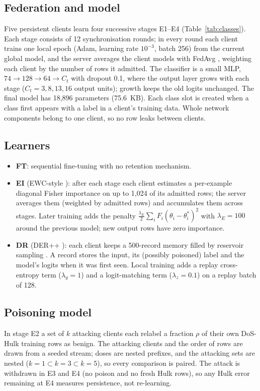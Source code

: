 \documentclass[10pt,a4paper]{article}
\begin{document}
\subsection{Federation and model}
Five persistent clients learn four successive stages E1--E4 (Table~\ref{tab:classes}). Each stage consists of 12 synchronisation rounds; in every round each client trains one local epoch (Adam, learning rate $10^{-3}$, batch 256) from the current global model, and the server averages the client models with FedAvg \cite{fedavg}, weighting each client by the number of rows it admitted. The classifier is a small MLP, $74\rightarrow128\rightarrow64\rightarrow C_t$ with dropout 0.1, where the output layer grows with each stage ($C_t = 3, 8, 13, 16$ output units); growth keeps the old logits unchanged. The final model has 18,896 parameters (75.6~KB). Each class slot is created when a class first appears with a label in a client's training data. Whole network components belong to one client, so no row leaks between clients.

\subsection{Learners}
\begin{itemize}
\item \textbf{FT}: sequential fine-tuning with no retention mechanism.
\item \textbf{EI} (EWC-style \cite{ewc}): after each stage each client estimates a per-example diagonal Fisher importance on up to 1,024 of its admitted rows; the server averages them (weighted by admitted rows) and accumulates them across stages. Later training adds the penalty $\tfrac{\lambda_E}{2}\sum_i F_i(\theta_i-\theta^\ast_i)^2$ with $\lambda_E=100$ around the previous model; new output rows have zero importance.
\item \textbf{DR} (DER++ \cite{der}): each client keeps a 500-record memory filled by reservoir sampling \cite{vitter}. A record stores the input, its (possibly poisoned) label and the model's logits when it was first seen. Local training adds a replay cross-entropy term ($\lambda_y=1$) and a logit-matching term ($\lambda_z=0.1$) on a replay batch of 128.
\end{itemize}

\subsection{Poisoning model}
In stage E2 a set of $k$ attacking clients each relabel a fraction $\rho$ of their own DoS-Hulk training rows as benign. The attacking clients and the order of rows are drawn from a seeded stream; doses are nested prefixes, and the attacking sets are nested ($k{=}1\subset k{=}3\subset k{=}5$), so every comparison is paired. The attack is withdrawn in E3 and E4 (no poison and no fresh Hulk rows), so any Hulk error remaining at E4 measures persistence, not re-learning.
\end{document}
